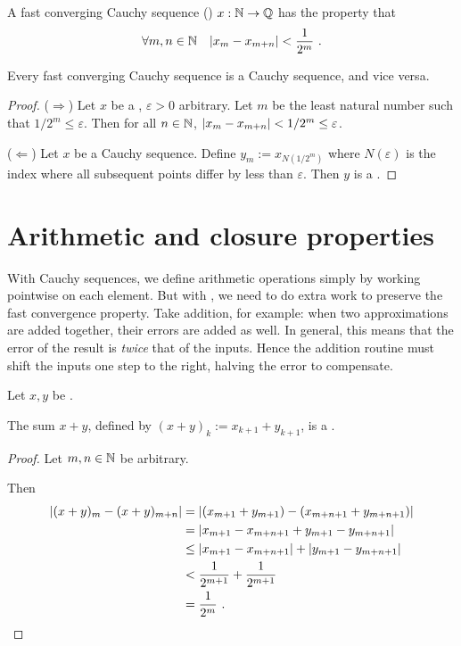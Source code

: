 \documentclass[leqno]{report}
\begin{document}
\begin{Definition}
    A fast converging Cauchy sequence (\FCCS) $x : \mathbb{N} \rightarrow \mathbb{Q}$ has the property that
    \[ \forall {m, n \in \mathbb{N}} \quad { \left| x_m - x_{m+n} \right| < \frac{1}{2^m} } \ . \]
\end{Definition}

\begin{Proposition}
    Every fast converging Cauchy sequence is a Cauchy sequence, and vice versa.
\end{Proposition}

\begin{proof}
    ($\Rightarrow$) Let $x$ be a \FCCS, $\varepsilon > 0$ arbitrary. Let $m$ be the least natural number such that $1/2^m \leq \varepsilon$. Then for all $n \in \mathbb{N}$, $\left| x_m - x_{m+n} \right| < 1/2^m \leq \varepsilon$.

    ($\Leftarrow$) Let $x$ be a Cauchy sequence. Define $y_m := x_{N(1/2^m)}$ where $N(\varepsilon)$ is the index where all subsequent points differ by less than $\varepsilon$. Then $y$ is a \FCCS.
\end{proof}

\section{Arithmetic and closure properties}

With Cauchy sequences, we define arithmetic operations simply by working pointwise on each element. But with \FCCS, we need to do extra work to preserve the fast convergence property. Take addition, for example: when two approximations are added together, their errors are added as well. In general, this means that the error of the result is \textit{twice} that of the inputs. Hence the addition routine must shift the inputs one step to the right, halving the error to compensate.

\begin{Proposition}[Addition]
    \label{add}
    Let $x, y$ be \FCCS.

    The sum $x + y$, defined by $(x+y)_k := x_{k+1} + y_{k+1}$, is a \FCCS.
\end{Proposition}

\begin{proof}
    Let $m, n \in \mathbb{N}$ be arbitrary.

    Then
    \begin{align*}
        \left| (x+y)_m - (x+y)_{m+n} \right|
        &= \left| (x_{m+1} + y_{m+1}) - (x_{m+n+1} + y_{m+n+1}) \right| \\
        &= \left| x_{m+1} - x_{m+n+1} + y_{m+1} - y_{m+n+1} \right| \\
        &\leq \left| x_{m+1} - x_{m+n+1} \right| + \left| y_{m+1} - y_{m+n+1} \right| \\
        &< \frac{1}{2^{m+1}} + \frac{1}{2^{m+1}} \\
        &= \frac{1}{2^m}
        \ . \qedhere
    \end{align*}
\end{proof}
\end{document}
